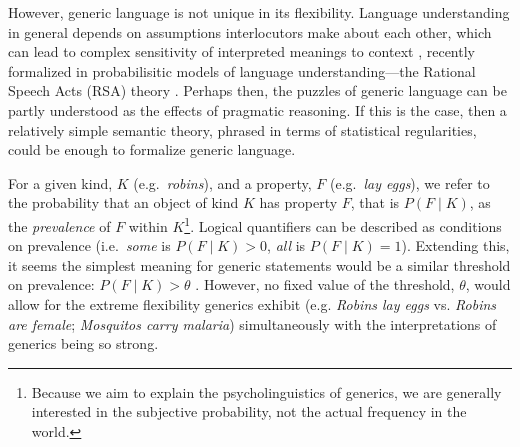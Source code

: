 \documentclass[10pt,letterpaper]{article}
\begin{document}
However, generic language is not unique in its flexibility.
Language understanding in general depends on assumptions interlocutors make about each other, which can lead to complex sensitivity of interpreted meanings to context \cite{Clark1996, Grice1975, Levinson2000}, recently formalized in probabilisitic models of language understanding---the Rational Speech Acts (RSA) theory \cite{Frank2012, Goodman2013, Franke2009}. 
Perhaps then, the puzzles of generic language can be partly understood as the effects of pragmatic reasoning.
If this is the case, then a relatively simple semantic theory, phrased in terms of statistical regularities, could be enough to formalize generic language.



For a given kind, $K$ (e.g.~\emph{robins}), and a property, $F$ (e.g.~\emph{lay eggs}), we refer to the probability that an object of kind $K$ has property $F$, that is $P(F\mid K)$, as the \emph{prevalence} of $F$ within $K$\footnote{Because we aim to explain the psycholinguistics of generics, we are generally interested in the subjective probability, not the actual frequency in the world.}.
Logical quantifiers can be described as conditions on prevalence (i.e.~\emph{some} is $P(F\mid K)>0$, \emph{all} is $P(F\mid K)=1$). 
Extending this, it seems the simplest meaning for generic statements would be a similar threshold on prevalence: $P(F\mid K)>\theta$ \cite{Cohen1999}. 
However, no fixed value of the threshold, $\theta$, would allow for the extreme flexibility generics exhibit (e.g. \emph{Robins lay eggs} vs. \emph{Robins are female}; \emph{Mosquitos carry malaria}) simultaneously with the interpretations of generics being so strong. 
\end{document}

